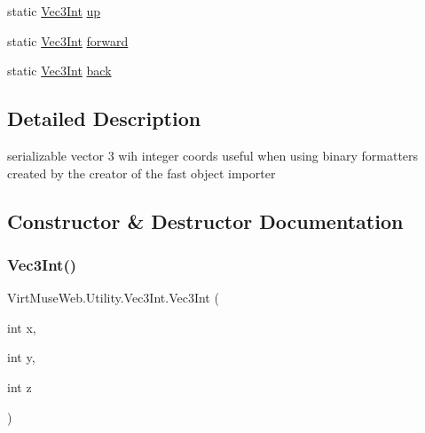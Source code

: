 \begin{DoxyCompactItemize}
static \mbox{\hyperlink{class_virt_muse_web_1_1_utility_1_1_vec3_int}{Vec3\+Int}} \mbox{\hyperlink{class_virt_muse_web_1_1_utility_1_1_vec3_int_a2accea1b031b96475f4c8c51c5ae7ee2}{up}}
\item 
static \mbox{\hyperlink{class_virt_muse_web_1_1_utility_1_1_vec3_int}{Vec3\+Int}} \mbox{\hyperlink{class_virt_muse_web_1_1_utility_1_1_vec3_int_ad385c36b38cdfc1f68332de1ba8cbae2}{forward}}
\item 
static \mbox{\hyperlink{class_virt_muse_web_1_1_utility_1_1_vec3_int}{Vec3\+Int}} \mbox{\hyperlink{class_virt_muse_web_1_1_utility_1_1_vec3_int_adf508cd36d69991146611df3a1bacbe5}{back}}
\end{DoxyCompactItemize}


\subsection{Detailed Description}
serializable vector 3 wih integer coords useful when using binary formatters created by the creator of the fast object importer 



\subsection{Constructor \& Destructor Documentation}
\mbox{\label{class_virt_muse_web_1_1_utility_1_1_vec3_int_a620fcd4f2b087423da48dbce79de16c3}} 
\subsubsection{\texorpdfstring{Vec3\+Int()}{Vec3Int()}\hspace{0.1cm}{\footnotesize\ttfamily [1/3]}}
{\footnotesize\ttfamily Virt\+Muse\+Web.\+Utility.\+Vec3\+Int.\+Vec3\+Int (\begin{DoxyParamCaption}\item[{int}]{x,  }\item[{int}]{y,  }\item[{int}]{z }\end{DoxyParamCaption})}

